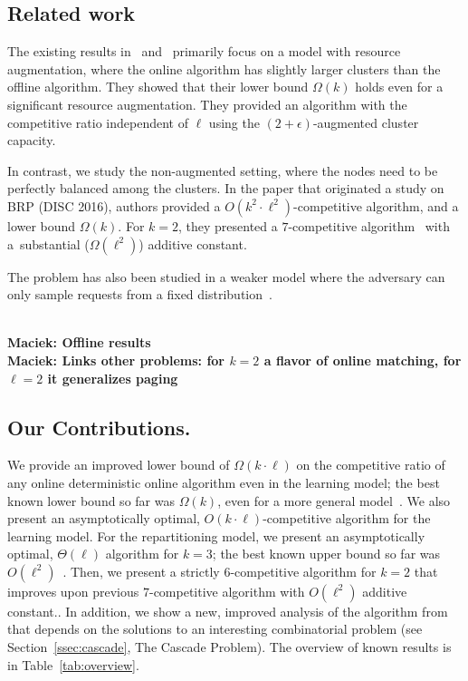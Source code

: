 \documentclass[manuscript,screen=true, review, anonymous]{acmart}
\newcommand\maciek[1]{\color{brown}\textbf{\\ Maciek: #1}\color{black}}
\begin{document}
\subsection{Related work}


The existing results in~\cite{repartition-disc} and~\cite{sigmetrics19_partitioning} primarily focus on a model with resource augmentation, where  the online algorithm has slightly larger clusters than the offline algorithm.
They showed that their lower bound $\Omega(k)$ holds even for a significant resource augmentation.
They provided an algorithm with the competitive ratio independent of $\ell$ using the $(2+\epsilon)$-augmented cluster capacity.


In contrast, we study the non-augmented setting, where the nodes need to be perfectly balanced  among the clusters.
In the paper that originated a study on BRP \cite{repartition-disc} (DISC 2016), authors provided a $O(k^2 \cdot \ell^2)$-competitive algorithm, and a lower bound $\Omega(k)$.
For $k=2$, they presented a $7$-competitive algorithm~\cite{repartition-disc} with a~substantial ($\Omega(\ell^2)$) additive constant.


The problem has also been studied in a weaker
model where the adversary can only sample
requests from a fixed distribution~\cite{stochastic-ring}.



\maciek{Offline results}
\maciek{Links other problems: for $k=2$ a flavor of online matching, for $\ell = 2$ it generalizes paging}


\subsection{Our Contributions.}
We provide an improved lower bound 
of $\Omega(k\cdot\ell)$ on the competitive ratio of any online deterministic online algorithm 
even in the learning model;
the best known lower bound so far was $\Omega(k)$,
even for a more general model~\cite{repartition-disc}.
We also present an asymptotically optimal, 
$O(k\cdot \ell)$-competitive algorithm
for the learning model.
For the repartitioning model, we present  
an asymptotically optimal,
$\Theta(\ell)$ algorithm for $k=3$;
the best known upper bound 
so far was $O(\ell^2)$~\cite{repartition-disc}.
Then, we present a strictly $6$-competitive algorithm for $k=2$ that improves upon previous $7$-competitive algorithm with $O(\ell^2)$ additive constant..
In addition, we show a new, improved analysis of the algorithm from \cite{repartition-disc} that depends on the solutions to an interesting combinatorial problem (see Section~\ref{ssec:cascade}, The Cascade Problem).
%
The overview of known results is in Table~\ref{tab:overview}.
\end{document}
